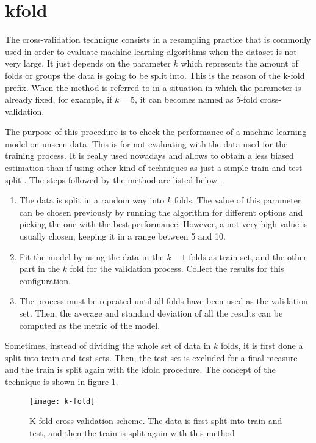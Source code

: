 \section{\acrlong{kfold}}
\label{appendix:kfold}

	The cross-validation technique consists in a resampling practice that is commonly used in order to evaluate machine learning algorithms when the dataset is not very large. It just depends on the parameter $k$ which represents the amount of folds or groups the data is going to be split into. This is the reason of the k-fold prefix. When the method is referred to in a situation in which the parameter is already fixed, for example, if $k = 5$, it can becomes named as 5-fold cross-validation.
	
	The purpose of this procedure is to check the performance of a machine learning model on unseen data. This is for not evaluating with the data used for the training process. It is really used nowadays and allows to obtain a less biased estimation than if using other kind of techniques as just a simple train and test split \cite{Browniee2018}. The steps followed by the method are listed below \cite{M2018}.
	
	\begin{enumerate}
		\item The data is split in a random way into $k$ folds. The value of this parameter can be chosen previously by running the algorithm for different options and picking the one with the best performance. However, a not very high value is usually chosen, keeping it in a range between 5 and 10.
		\item Fit the model by using the data in the $k - 1$ folds as train set, and the other part in the $k$ fold for the validation process. Collect the results for this configuration.
		\item The process must be repeated until all folds have been used as the validation set. Then, the average and standard deviation of all the results can be computed as the metric of the model. 
	\end{enumerate}

	Sometimes, instead of dividing the whole set of data in $k$ folds, it is first done a split into train and test sets. Then, the test set is excluded for a final measure and the train is split again with the \acrlong{kfold} procedure. The concept of the technique is shown in figure \ref{fig:mesh16}.
	
	\begin{figure}[ht]
		\centering
		\captionsetup{justification=centering}
		\texttt{[image: k-fold]}
		\caption{K-fold cross-validation scheme. The data is first split into train and test, and then the train is split again with this method \cite{Scikit-learna}}
		\label{fig:mesh16}
	\end{figure}


